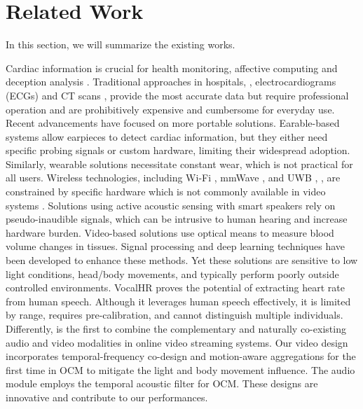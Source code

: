 
\section{Related Work}
In this section, we will summarize the existing works.

Cardiac information is crucial for health monitoring, affective computing \cite{yang2022survey, fairclough2020personal} and deception analysis \cite{bian2024ubihr}. 
Traditional approaches in hospitals, \eg, electrocardiograms (ECGs) and CT scans \cite{HeartDiseaseSymptoms}, provide the most accurate data but require professional operation and are prohibitively expensive and cumbersome for everyday use. Recent advancements have focused on more portable solutions.
Earable-based systems \cite{cao2023heartprint, chen2024exploring, fan2023apg} allow earpieces to detect cardiac information, but they either need specific probing signals or custom hardware, limiting their widespread adoption. Similarly, wearable solutions necessitate constant wear, which is not practical for all users. Wireless technologies, including Wi-Fi \cite{liu2015tracking}, mmWave \cite{yang2016monitoring}, and UWB \cite{chen2021movi}, \etc, are constrained by specific hardware which is not commonly available in video systems . 
Solutions using active acoustic sensing \cite{wang2023df, wang2022loear, qian2018acousticcardiogram, zhang2020your} with smart speakers rely on pseudo-inaudible signals, which can be intrusive to human hearing and increase hardware burden.
Video-based solutions use optical means to measure blood volume changes in tissues. Signal processing \cite{de2013robust, li2014remote, wang2016algorithmic, wang2015novel} and deep learning \cite{chen2018deepphys, liu2020multi, niu2020video, li2023learning, yu2019remote,yu2019remoteCompress, yu2023physformer++, liu2023efficientphys, zou2024rhythmformer} techniques have been developed to enhance these methods. Yet these solutions are sensitive to low light conditions, head/body movements, and typically perform poorly outside controlled environments. VocalHR \cite{xu2022hearing} proves the potential of extracting heart rate from human speech. Although it leverages human speech effectively, it is limited by range, requires pre-calibration, and cannot distinguish multiple individuals. 
Differently, \sysname is the first to combine the complementary and naturally co-existing audio and video modalities in online video streaming systems. Our video design incorporates temporal-frequency co-design and motion-aware aggregations for the first time in OCM to mitigate the light and body movement influence. The audio module employs the temporal acoustic filter for OCM. These designs are innovative and contribute to our performances.


